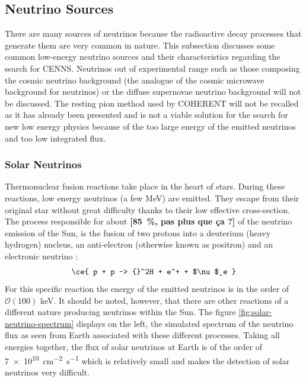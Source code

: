 \subsection{Neutrino Sources}

There are many sources of neutrinos because the radioactive decay processes that generate them are very common in nature. This subsection discusses some common low-energy neutrino sources and their characteristics regarding the search for CENNS. Neutrinos out of experimental range such as those composing the cosmic neutrino background (the analogue of the cosmic microwave background for neutrinos) or the diffuse supernovae neutrino background will not be discussed. The resting pion method used by COHERENT will not be recalled as it has already been presented and is not a viable solution for the search for new low energy physics because of the too large energy of the emitted neutrinos and too low integrated flux.

\subsubsection{Solar Neutrinos}

Thermonuclear fusion reactions take place in the heart of stars. During these reactions, low energy neutrinos (a few \si{\mega\eV}) are emitted. They escape from their original star without great difficulty thanks to their low effective cross-section. The process responsible for about \textbf{[\SI{85}{\percent}, pas plus que ça ?]} of the neutrino emission of the Sun, is the fusion of two protons  into a  deuterium (heavy hydrogen) nucleus, an anti-electron  (otherwise known as positron) and an electronic neutrino :
\begin{equation}
\ce{ p + p -> {}^2H + e^+ + $\nu$_e }
\end{equation}
For this specific reaction the energy of the emitted neutrinos is in the order of $\mathcal{O}(100)$ \si{\kilo\eV}. It should be noted, however, that there are other reactions of a different nature producing neutrinos within the Sun. The figure \ref{fig:solar-neutrino-spectrum} displays on the left, the simulated spectrum of the neutrino flux as seen from Earth associated with these different processes. Taking all energies together, the flux of solar neutrinos at Earth is of the order of \SI{7e10}{\cm^{-2} \s^{-1}} which is relatively small and makes the detection of solar neutrinos very difficult.

